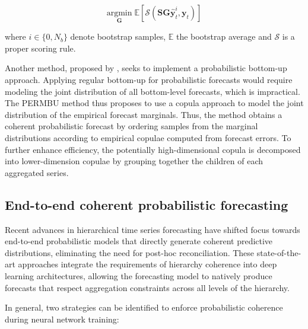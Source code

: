 \documentclass[letterpaper]{article}
\begin{document}
\begin{equation}
    \underset{\mathbf{G}}{\mathrm{argmin}} \; \mathbb{E}\left[ \mathcal{S}(\mathbf{SG}\hat{\mathbf{y}}^i_t, \mathbf{y}_t) \right]
\end{equation}

where $i\in\{0, N_b\}$ denote bootstrap samples, $\mathbb{E}$ the bootstrap average and $\mathcal{S}$ is a proper scoring rule. 

Another method, proposed by \cite{PERMBU}, seeks to implement a probabilistic bottom-up approach. 
Applying regular bottom-up for probabilistic forecasts would require modeling the joint distribution of all bottom-level forecasts, which is impractical.
The PERMBU method thus proposes to use a copula \cite{Copula_book} approach to model the joint distribution of the empirical forecast marginals. 
Thus, the method obtains a coherent probabilistic forecast by ordering samples from the marginal distributions according to empirical copulae computed from forecast errors. 
To further enhance efficiency, the potentially high-dimensional copula is decomposed into lower-dimension copulae by grouping together the children of each aggregated series. 

\subsection{End-to-end coherent probabilistic forecasting}

Recent advances in hierarchical time series forecasting have shifted focus towards end-to-end probabilistic models that directly generate coherent predictive distributions, eliminating the need for post-hoc reconciliation. 
These state-of-the-art approaches integrate the requirements of hierarchy coherence into deep learning architectures, allowing the forecasting model to natively produce forecasts that respect aggregation constraints across all levels of the hierarchy.

In general, two strategies can be identified to enforce probabilistic coherence during neural network training: 
\end{document}
